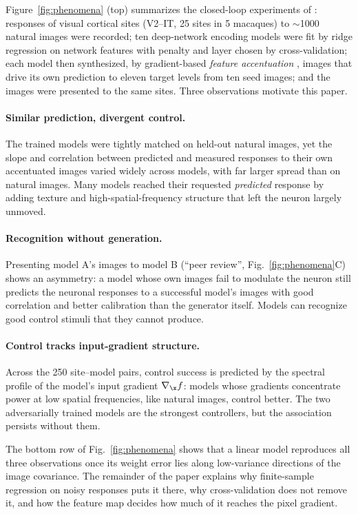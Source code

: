 Figure~\ref{fig:phenomena} (top) summarizes the closed-loop experiments of \citetPW: responses of visual cortical sites (V2--IT, 25 sites in 5 macaques) to $\sim$1000 natural images were recorded; ten deep-network encoding models were fit by ridge regression on network features with penalty and layer chosen by cross-validation; each model then synthesized, by gradient-based \emph{feature accentuation} \citep{hamblin2024feature}, images that drive its own prediction to eleven target levels from ten seed images; and the images were presented to the same sites. Three observations motivate this paper.

\paragraph{Similar prediction, divergent control.}
The trained models were tightly matched on held-out natural images, yet the slope and correlation between predicted and measured responses to their own accentuated images varied widely across models, with far larger spread than on natural images. Many models reached their requested \emph{predicted} response by adding texture and high-spatial-frequency structure that left the neuron largely unmoved.

\paragraph{Recognition without generation.}
Presenting model A's images to model B (``peer review'', Fig.~\ref{fig:phenomena}C) shows an asymmetry: a model whose own images fail to modulate the neuron still predicts the neuronal responses to a successful model's images with good correlation and better calibration than the generator itself. Models can recognize good control stimuli that they cannot produce.

\paragraph{Control tracks input-gradient structure.}
Across the 250 site--model pairs, control success is predicted by the spectral profile of the model's input gradient $\nabla_\x f$: models whose gradients concentrate power at low spatial frequencies, like natural images, control better. The two adversarially trained models are the strongest controllers, but the association persists without them.

The bottom row of Fig.~\ref{fig:phenomena} shows that a linear model reproduces all three observations once its weight error lies along low-variance directions of the image covariance. The remainder of the paper explains why finite-sample regression on noisy responses puts it there, why cross-validation does not remove it, and how the feature map decides how much of it reaches the pixel gradient.

